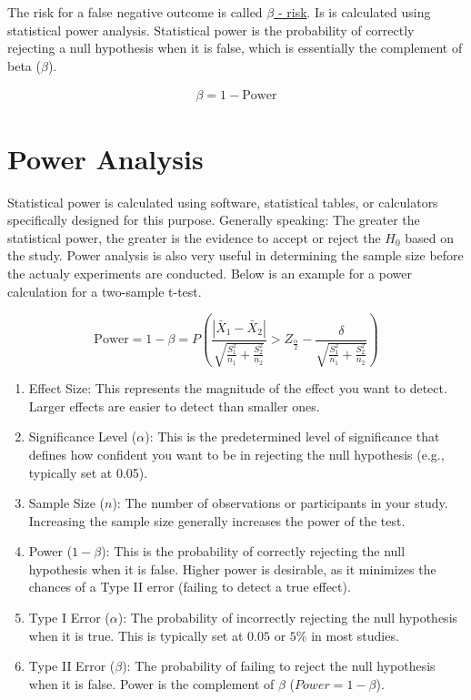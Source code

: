 \documentclass[
  a4paper,
]{scrbook}
\begin{document}
The risk for a false negative outcome is called
\hyperref[beta-risk]{\(\beta\) - risk}. Is is calculated using
statistical power analysis. Statistical power is the probability of
correctly rejecting a null hypothesis when it is false, which is
essentially the complement of beta (\(\beta\)).

\begin{align}
\beta = 1 - \text{Power}
\end{align}

\section{Power Analysis}\label{power-analysis}

Statistical power is calculated using software, statistical tables, or
calculators specifically designed for this purpose. Generally speaking:
The greater the statistical power, the greater is the evidence to accept
or reject the \(H_0\) based on the study. Power analysis is also very
useful in determining the sample size before the actualy experiments are
conducted. Below is an example for a power calculation for a two-sample
t-test.

\[
\text{Power} = 1 - \beta = P\left(\frac{{|\bar{X}_1 - \bar{X}_2|}}{\sqrt{\frac{S_1^2}{n_1} + \frac{S_2^2}{n_2}}} > Z_{\frac{\alpha}{2}} - \frac{\delta}{\sqrt{\frac{S_1^2}{n_1} + \frac{S_2^2}{n_2}}}\right)
\]

\begin{enumerate}
\def\labelenumi{\arabic{enumi}.}
\item
  Effect Size: This represents the magnitude of the effect you want to
  detect. Larger effects are easier to detect than smaller ones.
\item
  Significance Level (\(\alpha\)): This is the predetermined level of
  significance that defines how confident you want to be in rejecting
  the null hypothesis (e.g., typically set at 0.05).
\item
  Sample Size (\(n\)): The number of observations or participants in
  your study. Increasing the sample size generally increases the power
  of the test.
\item
  Power (\(1 - \beta\)): This is the probability of correctly rejecting
  the null hypothesis when it is false. Higher power is desirable, as it
  minimizes the chances of a Type II error (failing to detect a true
  effect).
\item
  Type I Error (\(\alpha\)): The probability of incorrectly rejecting
  the null hypothesis when it is true. This is typically set at \(0.05\)
  or \(5\%\) in most studies.
\item
  Type II Error (\(\beta\)): The probability of failing to reject the
  null hypothesis when it is false. Power is the complement of \(\beta\)
  (\(Power = 1 - \beta\)).
\end{enumerate}
\end{document}
